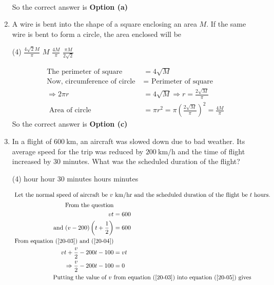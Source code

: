 \begin{enumerate}
\begin{answer}
\begin{align*}
	\end{align*}
		So the correct answer is \textbf{Option (a)}
\end{answer}
\item  A wire is bent into the shape of a square enclosing an area $M$. If the same wire is bent to form a circle, the area enclosed will be
 \begin{tasks}(4)
	\task[\textbf{a.}]$\frac{4 \sqrt{2} M}{\pi}$
	\task[\textbf{b.}]$M$
	\task[\textbf{c.}] $\frac{4 M}{\pi}$
	\task[\textbf{d.}] $\frac{\pi M}{2 \sqrt{2}}$
\end{tasks}
\begin{answer}
	\begin{align*}
\text{The perimeter of square }&=4 \sqrt{M}\\
	\text{Now, circumference of circle }&=\text{ Perimeter of square}\\
	\Rightarrow 2 \pi r&=4 \sqrt{M} \Rightarrow r=\frac{2 \sqrt{M}}{\pi}\\
\text{	Area of circle }&=\pi r^{2}=\pi\left(\frac{2 \sqrt{M}}{\pi}\right)^{2}=\frac{4 M}{\pi}
	\end{align*}
		So the correct answer is \textbf{Option (c)}
\end{answer}
\item  In a flight of $600 \mathrm{~km}$, an aircraft was slowed down due to bad weather. Its average speed for the trip was reduced by $200 \mathrm{~km} / \mathrm{h}$ and the time of flight increased by 30 minutes. What was the scheduled duration of the flight?
 \begin{tasks}(4)
	 hour
	 hour 30 minutes
	 hours
	 minutes
\end{tasks}	
\begin{answer}
	\begin{align}
	\intertext{ Let the normal speed of aircraft be $v \mathrm{~km} / \mathrm{hr}$ and the scheduled duration of the flight be $t$ hours.}
\text{	From the question}\notag\\
	v t&=600\label{20-03}\\
\text{	and }(v-200)\left(t+\frac{1}{2}\right)&=600\label{20-04}\\
\text{	From equation (\ref{20-03}) and (\ref{20-04})}\notag\\
	v t+\frac{v}{2}-200 t-100&=v t \notag\\
	\Rightarrow \frac{v}{2}-200 t-100&=0\label{20-05}\\
\text{	Putting the value of $v$ }&\text{from equation (\ref{20-03}) into equation (\ref{20-05}) gives}\notag\\

\end{align}
\end{answer}
\end{enumerate}
